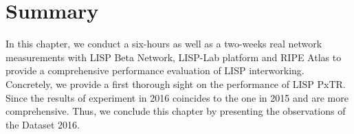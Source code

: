 \section{Summary}
\label{sec:pxtr_conclusion}
In this chapter, we conduct a six-hours as well as a two-weeks real network measurements with LISP Beta Network, LISP-Lab platform and RIPE Atlas to provide a comprehensive performance evaluation of LISP interworking. Concretely, we provide a first thorough sight on the performance of LISP PxTR. Since the results of experiment in 2016 coincides to the one in 2015 and are more comprehensive. Thus, we conclude this chapter by presenting the observations of the Dataset 2016. 

